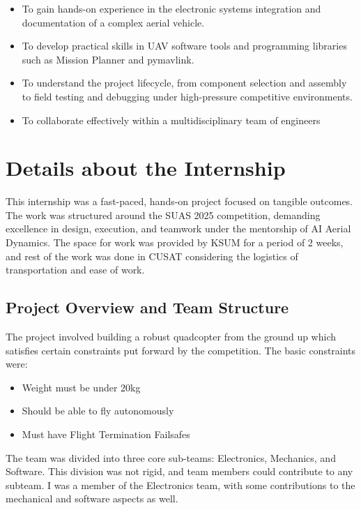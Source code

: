 \begin{itemize}
	\item To gain hands-on experience in the electronic systems integration and documentation of a complex aerial vehicle.
	\item To develop practical skills in UAV software tools and programming libraries such as Mission Planner and pymavlink.
	\item To understand the project lifecycle, from component selection and assembly to field testing and debugging under high-pressure competitive environments.
	\item To collaborate effectively within a multidisciplinary team of engineers
\end{itemize}

\section{Details about the Internship}

This internship was a fast-paced, hands-on project focused on tangible outcomes. The work was structured around the SUAS 2025 competition, demanding excellence in design, execution, and teamwork under the mentorship of AI Aerial Dynamics. The space for work was provided by KSUM for a period of 2 weeks, and rest of the work was done in CUSAT considering the logistics of transportation and ease of work.

\subsection{Project Overview and Team Structure}

The project involved building a robust quadcopter from the ground up which satisfies certain constraints put forward by the competition. The basic constraints were:
\begin{itemize}
	\item Weight must be under 20kg
	\item Should be able to fly autonomously
	\item Must have Flight Termination Failsafes
\end{itemize}

The team was divided into three core sub-teams: Electronics, Mechanics, and Software. This division was not rigid, and team members could contribute to any subteam. I was a member of the Electronics team, with some contributions to the mechanical and software aspects as well.

